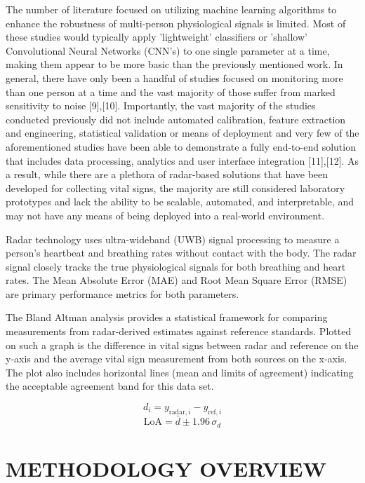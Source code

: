 \documentclass[conference]{IEEEtran}
\begin{document}
The number of literature focused on utilizing machine learning algorithms to enhance the robustness of multi-person physiological signals is limited. Most of these studies would typically apply 'lightweight' classifiers or 'shallow' Convolutional Neural Networks (CNN's) to one single parameter at a time, making them appear to be more basic than the previously mentioned work. In general, there have only been a handful of studies focused on monitoring more than one person at a time and the vast majority of those suffer from marked sensitivity to noise [9],[10]. Importantly, the vast majority of the studies conducted previously did not include automated calibration, feature extraction and engineering, statistical validation or means of deployment and very few of the aforementioned studies have been able to demonstrate a fully end-to-end solution that includes data processing, analytics and user interface integration [11],[12]. As a result, while there are a plethora of radar-based solutions that have been developed for collecting vital signs, the majority are still considered laboratory prototypes and lack the ability to be scalable, automated, and interpretable, and may not have any means of being deployed into a real-world environment.

Radar technology uses ultra-wideband (UWB) signal processing to measure a person's heartbeat and breathing rates without contact with the body. The radar signal closely tracks the true physiological signals for both breathing and heart rates. The Mean Absolute Error (MAE) and Root Mean Square Error (RMSE) are primary performance metrics for both parameters.

The Bland Altman analysis provides a statistical framework for comparing measurements from radar-derived estimates against reference standards. Plotted on such a graph is the difference in vital signs between radar and reference on the y-axis and the average vital sign measurement from both sources on the x-axis. The plot also includes horizontal lines (mean and limits of agreement) indicating the acceptable agreement band for this data set.

\begin{equation}
d_i = y_{\text{radar},i} - y_{\text{ref},i}
\end{equation}
\begin{equation}
\text{LoA} = \bar{d} \pm 1.96\,\sigma_d
\end{equation}

\section{METHODOLOGY OVERVIEW}
\end{document}
